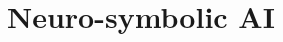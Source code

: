 \documentclass{beamer}
\begin{document}
{\frame[plain]{\titlepage}}
    \showoutlineatsection

%

    \section{Neuro-symbolic AI}
\end{document}
